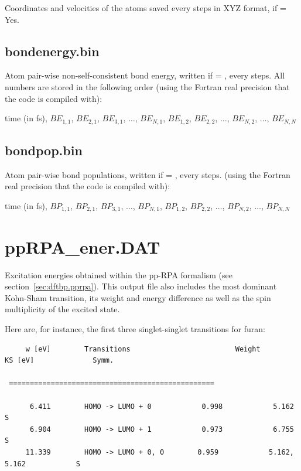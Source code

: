 Coordinates and velocities of the atoms saved every
 steps in XYZ format, if  = Yes.

\subsection{bondenergy.bin}
\label{sec:beformatout}

Atom pair-wise non-self-consistent bond energy, written if 
= , every  steps. All numbers are stored in the
following order (using the Fortran real precision that the code is compiled
with):

time (in fs), $BE_{1,1}$, $BE_{2,1}$, $BE_{3,1}$, $\dots$, $BE_{N,1}$,
$BE_{1,2}$, $BE_{2,2}$, $\dots$, $BE_{N,2}$, $\dots$, $BE_{N,N}$

\subsection{bondpop.bin}
\label{sec:bpformatout}

Atom pair-wise bond populations, written if  = ,
every  steps. (using the Fortran real precision that the code
is compiled with):

time (in fs), $BP_{1,1}$, $BP_{2,1}$, $BP_{3,1}$, $\dots$, $BP_{N,1}$,
$BP_{1,2}$, $BP_{2,2}$, $\dots$, $BP_{N,2}$, $\dots$, $BP_{N,N}$


\section{ppRPA\_ener.DAT}
\label{sec:ppRPAout}

Excitation energies obtained within the pp-RPA formalism (see
section~\ref{sec:dftbp.pprpa}). This output file also includes the
most dominant Kohn-Sham transition, its weight and energy difference
as well as the spin multiplicity of the excited state.

Here are, for instance, the first three singlet-singlet transitions
for furan:

\begin{verbatim}
     w [eV]        Transitions                         Weight            KS [eV]              Symm.

 =================================================

      6.411        HOMO -> LUMO + 0            0.998            5.162                     S
      6.904        HOMO -> LUMO + 1            0.973            6.755                     S
     11.339        HOMO -> LUMO + 0, 0        0.959            5.162,  5.162            S
\end{verbatim}

